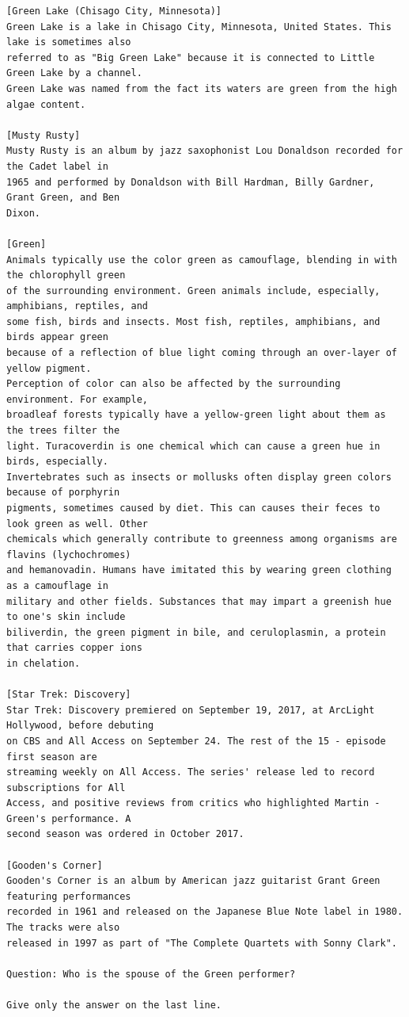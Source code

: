 \documentclass[10pt]{article}
\begin{document}
\begin{verbatim}
[Green Lake (Chisago City, Minnesota)]
Green Lake is a lake in Chisago City, Minnesota, United States. This lake is sometimes also
referred to as "Big Green Lake" because it is connected to Little Green Lake by a channel.
Green Lake was named from the fact its waters are green from the high algae content.

[Musty Rusty]
Musty Rusty is an album by jazz saxophonist Lou Donaldson recorded for the Cadet label in
1965 and performed by Donaldson with Bill Hardman, Billy Gardner, Grant Green, and Ben
Dixon.

[Green]
Animals typically use the color green as camouflage, blending in with the chlorophyll green
of the surrounding environment. Green animals include, especially, amphibians, reptiles, and
some fish, birds and insects. Most fish, reptiles, amphibians, and birds appear green
because of a reflection of blue light coming through an over-layer of yellow pigment.
Perception of color can also be affected by the surrounding environment. For example,
broadleaf forests typically have a yellow-green light about them as the trees filter the
light. Turacoverdin is one chemical which can cause a green hue in birds, especially.
Invertebrates such as insects or mollusks often display green colors because of porphyrin
pigments, sometimes caused by diet. This can causes their feces to look green as well. Other
chemicals which generally contribute to greenness among organisms are flavins (lychochromes)
and hemanovadin. Humans have imitated this by wearing green clothing as a camouflage in
military and other fields. Substances that may impart a greenish hue to one's skin include
biliverdin, the green pigment in bile, and ceruloplasmin, a protein that carries copper ions
in chelation.

[Star Trek: Discovery]
Star Trek: Discovery premiered on September 19, 2017, at ArcLight Hollywood, before debuting
on CBS and All Access on September 24. The rest of the 15 - episode first season are
streaming weekly on All Access. The series' release led to record subscriptions for All
Access, and positive reviews from critics who highlighted Martin - Green's performance. A
second season was ordered in October 2017.

[Gooden's Corner]
Gooden's Corner is an album by American jazz guitarist Grant Green featuring performances
recorded in 1961 and released on the Japanese Blue Note label in 1980. The tracks were also
released in 1997 as part of "The Complete Quartets with Sonny Clark".

Question: Who is the spouse of the Green performer?

Give only the answer on the last line.
\end{verbatim}
\end{document}
